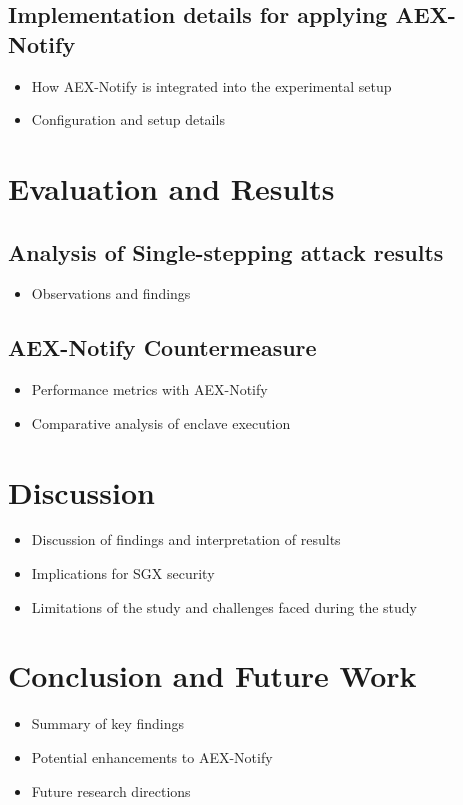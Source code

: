\documentclass{llncs}
\begin{document}
\subsection{Implementation details for applying AEX-Notify}
\begin{itemize}
  \item How AEX-Notify is integrated into the experimental setup
  \item Configuration and setup details
\end{itemize}

\section{Evaluation and Results}
\subsection{Analysis of Single-stepping attack results}
\begin{itemize}
    \item Observations and findings
\end{itemize}
\subsection{AEX-Notify Countermeasure}
\begin{itemize}
    \item Performance metrics with AEX-Notify
    \item Comparative analysis of enclave execution
\end{itemize}

\section{Discussion}
\begin{itemize}
  \item Discussion of findings and interpretation of results
  \item Implications for SGX security
  \item Limitations of the study and challenges faced during the study
\end{itemize}

\section{Conclusion and Future Work}
\begin{itemize}
    \item Summary of key findings
    \item Potential enhancements to AEX-Notify
    \item Future research directions
\end{itemize}


%

\end{document}
